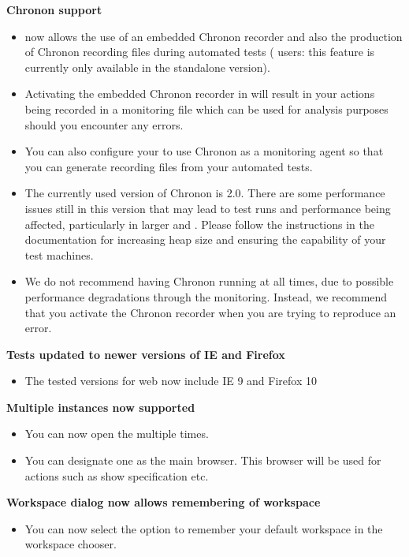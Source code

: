 \textbf{Chronon support}
\begin{itemize}
\item \app{} now allows the use of an embedded Chronon recorder and also the production of Chronon recording files during automated tests (\jb{} users: this feature is currently only available in the standalone version). 
\item Activating the embedded Chronon recorder in \app{} will result in your actions being recorded in a monitoring file which can be used for analysis purposes should you encounter any errors.
\item You can also configure your \gdaut{} to use Chronon as a monitoring agent so that you can generate recording files from your automated tests. 
\item The currently used version of Chronon is 2.0. There are some performance issues still in this version that may lead to test runs and performance being affected, particularly in larger \gdauts{} and \gdprojects{}. Please follow the instructions in the documentation for increasing heap size and ensuring the capability of your test machines. 
\item We do not recommend having Chronon running at all times, due to possible performance degradations through the monitoring. Instead, we recommend that you activate the Chronon recorder when you are trying to reproduce an error.
\end{itemize}

\textbf{Tests updated to newer versions of IE and Firefox}
\begin{itemize}
\item The tested versions for web \gdauts{} now include IE 9 and Firefox 10
\end{itemize}


\textbf{Multiple \gdtestcasebrowser{} instances now supported}
\begin{itemize}
\item You can now open the \gdtestcasebrowser{} multiple times.
\item You can designate one \gdtestcasebrowser{} as the main browser. This browser will be used for actions such as show specification etc.
\end{itemize}

\textbf{Workspace dialog now allows remembering of workspace}
\begin{itemize}
\item You can now select the option to remember your default workspace in the workspace chooser.
\end{itemize}

